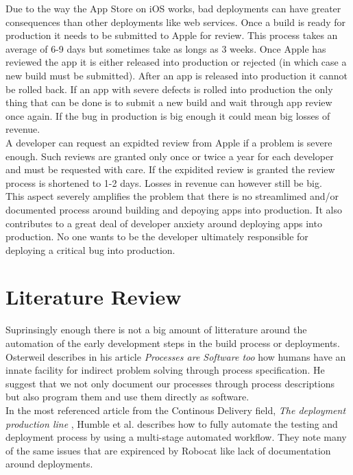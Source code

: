 \documentclass{ituthesis}
\begin{document}
Due to the way the App Store on iOS works, bad deployments can have greater consequences than other deployments like web services. Once a build is ready for production it needs to be submitted to Apple for review. This process takes an average of 6-9 days but sometimes take as longs as 3 weeks. Once Apple has reviewed the app it is either released into production or rejected (in which case a new build must be submitted). After an app is released into production it cannot be rolled back. If an app with severe defects is rolled into production the only thing that can be done is to submit a new build and wait through app review once again. If the bug in production is big enough it could mean big losses of revenue.\\

A developer can request an expidted review from Apple if a problem is severe enough. Such reviews are granted only once or twice a year for each developer and must be requested with care. If the expidited review is granted the review process is shortened to 1-2 days. Losses in revenue can however still be big.\\

This aspect severely amplifies the problem that there is no streamlimed and/or documented process around building and depoying apps into production. It also contributes to a great deal of developer anxiety around deploying apps into production. No one wants to be the developer ultimately responsible for deploying a critical bug into production.

\chapter{Literature Review}

Suprinsingly enough there is not a big amount of litterature around the automation of the early development steps in the build process or deployments.\\

Osterweil \cite{Osterweil1997} describes in his article \textit{Processes are Software too} how humans have an innate facility for indirect problem solving through process specification. He suggest that we not only document our processes through process descriptions but also program them and use them directly as software.\\

In the most referenced article from the Continous Delivery field, \textit{The deployment production line} \cite{Humble2006}, Humble et al. describes how to fully automate the testing and deployment process by using a multi-stage automated workflow. They note many of the same issues that are expirenced by Robocat like lack of documentation around deployments.\\
\end{document}
